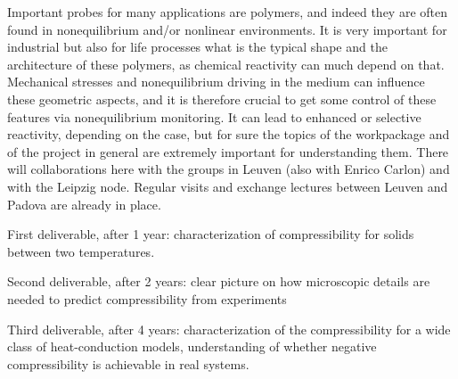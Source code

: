 \begin{workpackage}[id=WPcompress,wphases=0-48,
  short=Nonequilibrium compressibility, %
  title=Nonequilibrium compressibility, %
  lead=UNIPD,
  UNIPDRM=48]
\begin{tasklist}
  \begin{task}[title=TASK3,id=task3,PM=6,lead=UNIPD,wphases={18-24!0.5,24-48!1},partners={KUL,ULEI}]
Important probes for many applications are polymers, and indeed they are often found in nonequilibrium and/or nonlinear environments.
It is very important for industrial but also for life processes what is the typical shape and the architecture of these polymers, as chemical reactivity can much depend on that.
Mechanical stresses and nonequilibrium driving in the medium can influence these geometric aspects, and it is therefore crucial to get some control of these features via nonequilibrium monitoring.
It can lead to enhanced or selective reactivity, depending on the case, but for sure the topics of the workpackage and of the project in general are extremely important for understanding them.
There will collaborations here with the groups in Leuven (also with Enrico Carlon) and with the Leipzig node.  Regular visits and exchange lectures between Leuven and Padova are already in place.
    
    
  \end{task}

\end{tasklist}

\begin{wpdelivs}
  \begin{wpdeliv}[due=18,id=mydeliv1,dissem=PU,nature=DEM,lead=UNIPD]
      {First deliverable, after 1 year: characterization of compressibility for solids between two temperatures.}
  \end{wpdeliv}
  \begin{wpdeliv}[due=24,id=mydeliv2,dissem=PU,nature=DEM,lead=UNIPD]
      {Second deliverable, after 2 years: clear picture on how microscopic details are needed to predict compressibility from experiments}
  \end{wpdeliv}
  \begin{wpdeliv}[due=48,id=mydeliv3,dissem=PU,nature=DEM,lead=UNIPD]
      {Third deliverable, after 4 years: characterization of the compressibility for a wide class of heat-conduction models, understanding of whether negative compressibility is achievable in real systems.}
\end{wpdeliv}
\end{wpdelivs}




\end{workpackage}
